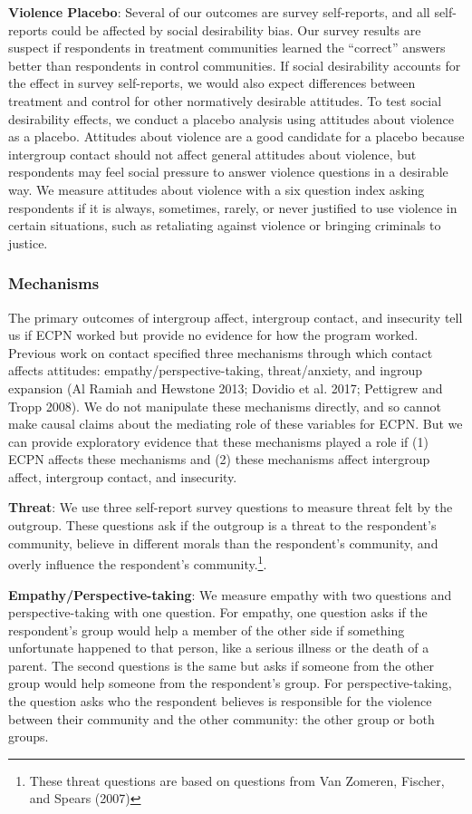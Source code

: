 \documentclass[11pt]{article}
\begin{document}
\textbf{Violence Placebo}: Several of our outcomes are survey
self-reports, and all self-reports could be affected by social
desirability bias. Our survey results are suspect if respondents in
treatment communities learned the ``correct'' answers better than
respondents in control communities. If social desirability accounts for
the effect in survey self-reports, we would also expect differences
between treatment and control for other normatively desirable attitudes.
To test social desirability effects, we conduct a placebo analysis using
attitudes about violence as a placebo. Attitudes about violence are a
good candidate for a placebo because intergroup contact should not
affect general attitudes about violence, but respondents may feel social
pressure to answer violence questions in a desirable way. We measure
attitudes about violence with a six question index asking respondents if
it is always, sometimes, rarely, or never justified to use violence in
certain situations, such as retaliating against violence or bringing
criminals to justice.

\hypertarget{mechanisms}{%
\subsubsection{Mechanisms}\label{mechanisms}}

The primary outcomes of intergroup affect, intergroup contact, and
insecurity tell us if ECPN worked but provide no evidence for how the
program worked. Previous work on contact specified three mechanisms
through which contact affects attitudes: empathy/perspective-taking,
threat/anxiety, and ingroup expansion (Al Ramiah and Hewstone 2013;
Dovidio et al. 2017; Pettigrew and Tropp 2008). We do not manipulate
these mechanisms directly, and so cannot make causal claims about the
mediating role of these variables for ECPN. But we can provide
exploratory evidence that these mechanisms played a role if (1) ECPN
affects these mechanisms and (2) these mechanisms affect intergroup
affect, intergroup contact, and insecurity.

\textbf{Threat}: We use three self-report survey questions to measure
threat felt by the outgroup. These questions ask if the outgroup is a
threat to the respondent's community, believe in different morals than
the respondent's community, and overly influence the respondent's
community.\footnote{These threat questions are based on questions from
  Van Zomeren, Fischer, and Spears (2007)}.

\textbf{Empathy/Perspective-taking}: We measure empathy with two
questions and perspective-taking with one question. For empathy, one
question asks if the respondent's group would help a member of the other
side if something unfortunate happened to that person, like a serious
illness or the death of a parent. The second questions is the same but
asks if someone from the other group would help someone from the
respondent's group. For perspective-taking, the question asks who the
respondent believes is responsible for the violence between their
community and the other community: the other group or both groups.
\end{document}

